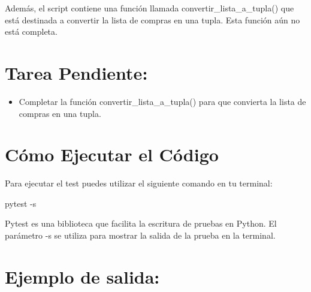 \documentclass[
  a4paper,
  DIV=11,
  numbers=noendperiod,
  onepage,
  openany]{scrreprt}
\newenvironment{Shaded}{\begin{snugshade}}{\end{snugshade}}
\newcommand{\AttributeTok}[1]{\textcolor[rgb]{0.40,0.45,0.13}{#1}}
\newcommand{\ExtensionTok}[1]{\textcolor[rgb]{0.00,0.23,0.31}{#1}}
\newcommand{\NormalTok}[1]{\textcolor[rgb]{0.00,0.23,0.31}{#1}}
\providecommand{\tightlist}{%
  \setlength{\itemsep}{0pt}\setlength{\parskip}{0pt}}\usepackage{longtable,booktabs,array}
\begin{document}
Además, el script contiene una función llamada
convertir\_lista\_a\_tupla() que está destinada a convertir la lista de
compras en una tupla. Esta función aún no está completa.

\section{Tarea Pendiente:}\label{tarea-pendiente}

\begin{itemize}
\tightlist
\item
  Completar la función convertir\_lista\_a\_tupla() para que convierta
  la lista de compras en una tupla.
\end{itemize}

\section{Cómo Ejecutar el Código}\label{cuxf3mo-ejecutar-el-cuxf3digo}

Para ejecutar el test puedes utilizar el siguiente comando en tu
terminal:

\begin{Shaded}
\begin{Highlighting}[]
\ExtensionTok{pytest} \AttributeTok{{-}s}
\end{Highlighting}
\end{Shaded}

Pytest es una biblioteca que facilita la escritura de pruebas en Python.
El parámetro -s se utiliza para mostrar la salida de la prueba en la
terminal.

\section{Ejemplo de salida:}\label{ejemplo-de-salida}

\begin{Shaded}
\end{Shaded}
\end{document}
